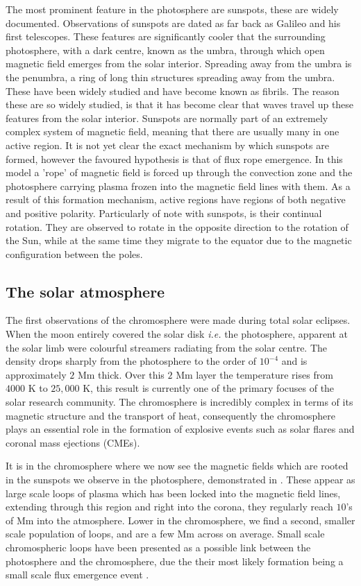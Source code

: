 The most prominent feature in the photosphere are sunspots, these are widely documented.
Observations of sunspots are dated as far back as Galileo and his first telescopes.
These features are significantly cooler that the surrounding photosphere, with a dark centre, known as the umbra, through which open magnetic field emerges from the solar interior.
Spreading away from the umbra is the penumbra, a ring of long thin structures spreading away from the umbra.
These have been widely studied and have become known as fibrils.
The reason these are so widely studied, is that it has become clear that waves travel up these features from the solar interior.
Sunspots are normally part of an extremely complex system of magnetic field, meaning that there are usually many in one active region.
It is not yet clear the exact mechanism by which sunspots are formed, however the favoured hypothesis is that of flux rope emergence.
In this model a 'rope' of magnetic field is forced up through the convection zone and the photosphere carrying plasma frozen into the magnetic field lines with them.
As a result of this formation mechanism, active regions have regions of both negative and positive polarity.
Particularly of note with sunspots, is their continual rotation.
They are observed to rotate in the opposite direction to the rotation of the Sun, while at the same time they migrate to the equator due to the magnetic configuration between the poles.


\subsection{The solar atmosphere}
The first observations of the chromosphere were made during total solar eclipses.
When the moon entirely covered the solar disk \emph{i.e.} the photosphere, apparent at the solar limb were colourful streamers radiating from the solar centre.
The density drops sharply from the photosphere to the order of $10^{-4}$ and is approximately $2$ Mm thick. 
Over this $2$ Mm layer the temperature rises from $4000$ K to $25,000$ K, \cite{Withrobe1977} this result is currently one of the primary focuses of the solar research community.
The chromosphere is incredibly complex in terms of its magnetic structure and the transport of heat, consequently the chromosphere plays an essential role in the formation of explosive events such as solar flares and coronal mass ejections (CMEs).

It is in the chromosphere where we now see the magnetic fields which are rooted in the sunspots we observe in the photosphere, demonstrated in \cite{Athay1976}.
These appear as large scale loops of plasma which has been locked into the magnetic field lines, extending through this region and right into the corona, they regularly reach $10$'s of Mm into the atmosphere.
Lower in the chromosphere, we find a second, smaller scale population of loops, and are a few Mm across on average.
Small scale chromospheric loops have been presented as a possible link between the photosphere and the chromosphere, due the their most likely formation being a small scale flux emergence event \cite{Ulmschneider1982}.

